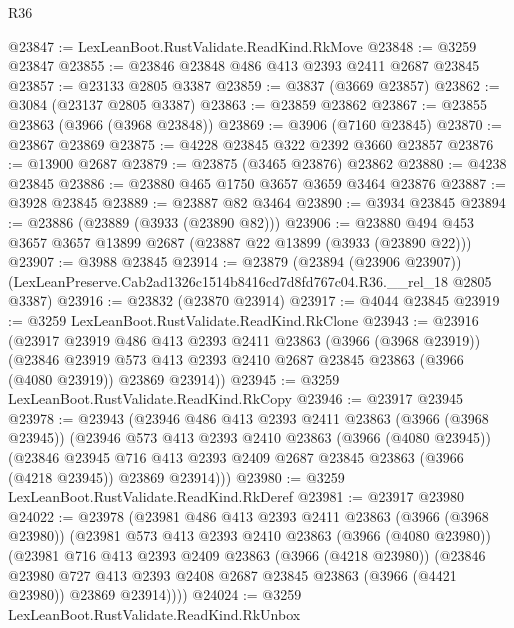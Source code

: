 \begin{lexlean}{R36}
\begin{coremodule}
@23847 := LexLeanBoot.RustValidate.ReadKind.RkMove
@23848 := @3259 @23847
@23855 := @23846 @23848 @486 @413 @2393 @2411 @2687 @23845
@23857 := @23133 @2805 @3387
@23859 := @3837 (@3669 @23857)
@23862 := @3084 (@23137 @2805 @3387)
@23863 := @23859 @23862
@23867 := @23855 @23863 (@3966 (@3968 @23848))
@23869 := @3906 (@7160 @23845)
@23870 := @23867 @23869
@23875 := @4228 @23845 @322 @2392 @3660 @23857
@23876 := @13900 @2687
@23879 := @23875 (@3465 @23876) @23862
@23880 := @4238 @23845
@23886 := @23880 @465 @1750 @3657 @3659 @3464 @23876
@23887 := @3928 @23845
@23889 := @23887 @82 @3464
@23890 := @3934 @23845
@23894 := @23886 (@23889 (@3933 (@23890 @82)))
@23906 := @23880 @494 @453 @3657 @3657 @13899 @2687 (@23887 @22 @13899 (@3933 (@23890 @22)))
@23907 := @3988 @23845
@23914 := @23879
    (@23894 (@23906 @23907))
    (LexLeanPreserve.Cab2ad1326c1514b8416cd7d8fd767c04.R36.__rel_18 @2805 @3387)
@23916 := @23832 (@23870 @23914)
@23917 := @4044 @23845
@23919 := @3259 LexLeanBoot.RustValidate.ReadKind.RkClone
@23943 := @23916
    (@23917
      @23919
      @486
      @413
      @2393
      @2411
      @23863
      (@3966 (@3968 @23919))
      (@23846
        @23919
        @573
        @413
        @2393
        @2410
        @2687
        @23845
        @23863
        (@3966 (@4080 @23919))
        @23869
        @23914))
@23945 := @3259 LexLeanBoot.RustValidate.ReadKind.RkCopy
@23946 := @23917 @23945
@23978 := @23943
    (@23946
      @486
      @413
      @2393
      @2411
      @23863
      (@3966 (@3968 @23945))
      (@23946
        @573
        @413
        @2393
        @2410
        @23863
        (@3966 (@4080 @23945))
        (@23846
          @23945
          @716
          @413
          @2393
          @2409
          @2687
          @23845
          @23863
          (@3966 (@4218 @23945))
          @23869
          @23914)))
@23980 := @3259 LexLeanBoot.RustValidate.ReadKind.RkDeref
@23981 := @23917 @23980
@24022 := @23978
    (@23981
      @486
      @413
      @2393
      @2411
      @23863
      (@3966 (@3968 @23980))
      (@23981
        @573
        @413
        @2393
        @2410
        @23863
        (@3966 (@4080 @23980))
        (@23981
          @716
          @413
          @2393
          @2409
          @23863
          (@3966 (@4218 @23980))
          (@23846
            @23980
            @727
            @413
            @2393
            @2408
            @2687
            @23845
            @23863
            (@3966 (@4421 @23980))
            @23869
            @23914))))
@24024 := @3259 LexLeanBoot.RustValidate.ReadKind.RkUnbox

\end{coremodule}
\end{lexlean}
